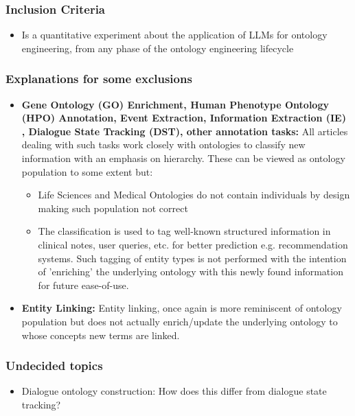 \documentclass[a4paper,colorinlistoftodos]{article}
\begin{document}
\subsubsection{Inclusion Criteria}
\label{subsubsec:inclusion-criteria}

\begin{itemize}
  \item Is a quantitative experiment about the application of LLMs for
    ontology engineering, from any phase of the ontology engineering lifecycle
  \end{itemize}

\subsubsection{Explanations for some exclusions}
\label{subsubsec:expln-exclusion}

\begin{itemize}
  \item \textbf{Gene Ontology (GO) Enrichment, Human Phenotype Ontology (HPO)
    Annotation, Event Extraction, Information Extraction (IE) , Dialogue State
    Tracking (DST), other annotation tasks:} All articles dealing with such
    tasks work closely with ontologies to classify new information with an
    emphasis on hierarchy. These can be viewed as ontology population to some
    extent but:
    \begin{itemize}
      \item Life Sciences and Medical Ontologies do not contain individuals by
        design making such population not correct
      \item The classification is used to tag well-known structured
        information in clinical notes, user queries, etc. for better
        prediction e.g. recommendation systems. Such tagging of entity types
        is not performed with the intention of 'enriching' the underlying
        ontology with this newly found information for future ease-of-use.
    \end{itemize}
  \item \textbf{Entity Linking:} Entity linking, once again is more
    reminiscent of ontology population but does not actually enrich/update the
    underlying ontology to whose concepts new terms are linked.
  \end{itemize}
  
\subsubsection{Undecided topics}
\label{subsubsec:endecided}
\begin{itemize}
  \item Dialogue ontology construction: How does this differ from dialogue
    state tracking?
  \end{itemize}  
\end{document}

